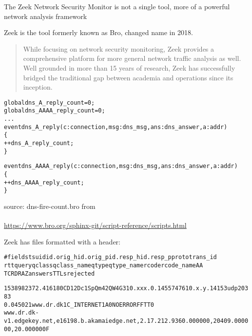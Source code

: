 \documentclass[Screen16to9,17pt]{foils}
\begin{document}


The Zeek Network Security Monitor is not a single tool, more of a
powerful network analysis framework

Zeek is the tool formerly known as Bro, changed name in 2018. 




\begin{quote}
While focusing on network security monitoring, Zeek provides a comprehensive platform for more general network traffic analysis as well. Well grounded in more than 15 years of research, Zeek has successfully bridged the traditional gap between academia and operations since its inception.
\end{quote}




\begin{alltt}\small
global dns_A_reply_count=0;
global dns_AAAA_reply_count=0;
...
event dns_A_reply(c: connection, msg: dns_msg, ans: dns_answer, a: addr)
        \{
        ++dns_A_reply_count;
        \}

event dns_AAAA_reply(c: connection, msg: dns_msg, ans: dns_answer, a: addr)
        \{
        ++dns_AAAA_reply_count;
        \}
\end{alltt}

source: dns-fire-count.bro from\\
{\small {}\\
\url{https://www.bro.org/sphinx-git/script-reference/scripts.html}}



Zeek has files formatted with a header:
\begin{alltt}\footnotesize
#fields ts      uid     id.orig_h       id.orig_p       id.resp_h       id.resp_p       proto   trans_id
        rtt     query   qclass  qclass_name     qtype   qtype_name      rcode   rcode_name      AA
        TC      RD      RA      Z       answers TTLs    rejected

1538982372.416180	CD12Dc1SpQm42QW4G3	10.xxx.0.145	57476	10.x.y.141	53	udp	20383
	0.045021	www.dr.dk	1	C_INTERNET	1	A	0	NOERROR	F	F	T	T	0
   www.dr.dk-v1.edgekey.net,e16198.b.akamaiedge.net,2.17.212.93	60.000000,20409.000000,20.000000	F
\end{alltt}
\end{document}
